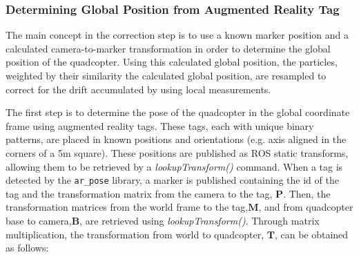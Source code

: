 \begin{spacing}{2.0}
\begin{algorithm}
\begin{algorithmic}[1]
				\\
				\\
					 
					\Else {}
					\EndIf
				\EndFor

				\\
				\\
				\\
				\EndFunction
			\end{algorithmic}
		\end{algorithm}
		\end{spacing}

		\subsubsection{Determining Global Position from Augmented Reality Tag}
			The main concept in the correction step is to use a known marker position and a calculated camera-to-marker transformation in order to determine the global position of the quadcopter. Using this calculated global position, the particles, weighted by their similarity the calculated global position, are resampled to correct for the drift accumulated by using local measurements.

			The first step is to determine the pose of the quadcopter in the global coordinate frame using augmented reality tags. These tags, each with unique binary patterns, are placed in known positions and orientations (e.g. axis aligned in the corners of a 5m square). These positions are published as ROS static transforms, allowing them to be retrieved by a \textit{lookupTransform()} command. When a tag is detected by the \texttt{ar\_pose} library, a marker is published containing the id of the tag and the transformation matrix from the camera to the tag, $\textbf{P}$. Then, the transformation matrices from the world frame to the tag,$\textbf{M}$,  and from quadcopter base to camera,$\textbf{B}$, are retrieved using \textit{lookupTransform()}. Through matrix multiplication, the transformation from world to quadcopter, $\textbf{T}$, can be obtained as follows:

